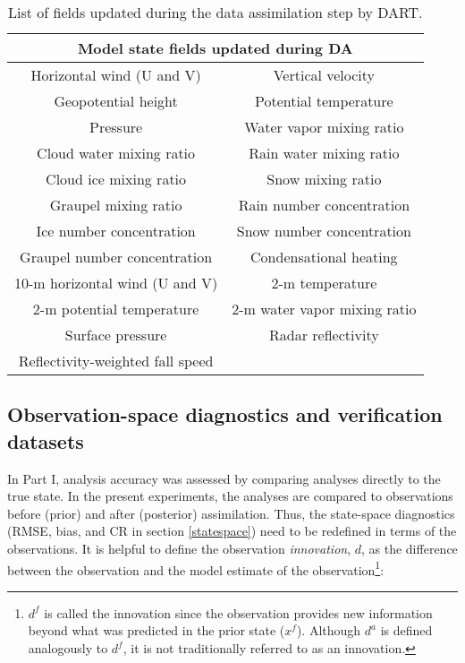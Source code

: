 \begin{table}
\centering
\begin{tabular}{ c | c}
\multicolumn{2}{c}{\bf Model state fields updated during DA} \\
\hline \hline
Horizontal wind (U and V) & Vertical velocity \\
Geopotential height & Potential temperature \\
Pressure & Water vapor mixing ratio \\
Cloud water mixing ratio & Rain water mixing ratio \\
Cloud ice mixing ratio & Snow mixing ratio \\
Graupel mixing ratio & Rain number concentration \\
Ice number concentration & Snow number concentration \\
Graupel number concentration & Condensational heating \\
10-m horizontal wind (U and V) & 2-m temperature \\
2-m potential temperature & 2-m water vapor mixing ratio \\
Surface pressure & Radar reflectivity \\
Reflectivity-weighted fall speed \\
\hline \hline
\end{tabular}
\caption{List of fields updated during the data assimilation step by DART.}
\label{state}
\end{table}

\subsection{Observation-space diagnostics and verification datasets}
In Part I, analysis accuracy was assessed by comparing analyses directly to the true state. In the present experiments, the analyses are compared to observations before (prior) and after (posterior) assimilation. Thus, the state-space diagnostics (RMSE, bias, and CR in section \ref{statespace}) need to be redefined in terms of the observations. It is helpful to define the observation \textit{innovation}, \(d\), as the difference between the observation and the model estimate of the observation\footnote{\(d^f\) is called the innovation since the observation provides new information beyond what was predicted in the prior state (\(x^f\)). Although \(d^a\) is defined analogously to \(d^f\), it is not traditionally referred to as an innovation.}:

